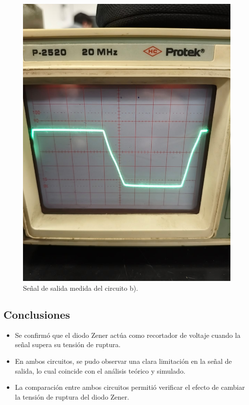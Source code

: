 \documentclass[chaptersright]{informeutn}
\begin{document}
\begin{figure}[H]
\begin{minipage}{0.4\textwidth}
    \includegraphics[width=\textwidth]{pictures/circuito_B_osciloscopio.jpeg}
    \caption{Señal de salida medida del circuito b).}
\end{minipage}
\end{figure}

\subsection*{Conclusiones}

\begin{itemize}
    \item Se confirmó que el diodo Zener actúa como recortador de voltaje cuando la señal supera su tensión de ruptura.
    \item En ambos circuitos, se pudo observar una clara limitación en la señal de salida, lo cual coincide con el análisis teórico y simulado.
    \item La comparación entre ambos circuitos permitió verificar el efecto de cambiar la tensión de ruptura del diodo Zener.
\end{itemize}
  
\end{document}
